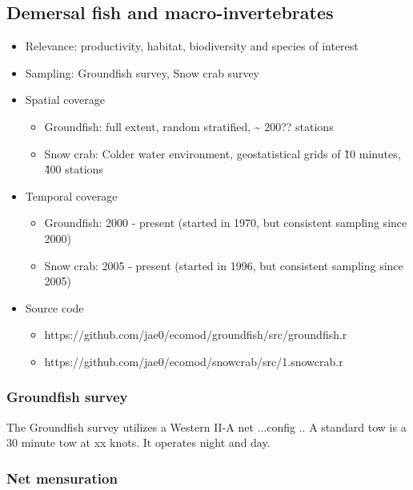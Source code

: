 \documentclass[letterpaper,portrait,11pt]{scrartcl}
\numberwithin{equation}{section}		%
\numberwithin{figure}{section}		%
\numberwithin{table}{section}				%
\begin{document}
\subsection{Demersal fish and macro-invertebrates}
\begin{itemize}
  \item Relevance:  productivity, habitat, biodiversity and species of interest
  \item Sampling:  Groundfish survey, Snow crab survey 
  \item Spatial coverage
    \begin{itemize}
      \item Groundfish: full extent, random stratified, \~{} 200?? stations
      \item Snow crab: Colder water environment, geostatistical grids of \~10 minutes, \~400 stations
    \end{itemize}
  \item Temporal coverage
    \begin{itemize}
      \item Groundfish: 2000 - present (started in 1970, but consistent sampling since 2000)
      \item Snow crab: 2005 - present (started in 1996, but consistent sampling since 2005)
    \end{itemize}

  \item Source code
      \begin{itemize}
        \item https://github.com/jae0/ecomod/groundfish/src/groundfish.r
        \item https://github.com/jae0/ecomod/snowcrab/src/1.snowcrab.r
      \end{itemize}
  
\end{itemize}


\subsubsection{Groundfish survey}

The Groundfish survey utilizes a Western II-A net ...config ..
A standard tow is a 30 minute tow at xx knots.
It operates night and day.


\subsubsection{Net mensuration} 
\end{document}
